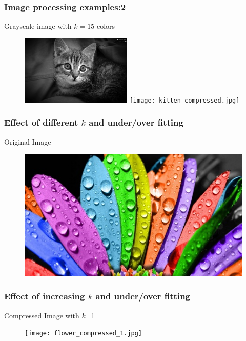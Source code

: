 \documentclass{beamer}
\begin{document}
\begin{frame}
\frametitle{Image processing examples:2}
Grayscale image with $k=15$ colors
\begin{figure}
\includegraphics[width=150pt]{kitten.jpg}
\quad 
\texttt{[image: kitten\_compressed.jpg]}
\end{figure}
\end{frame}

\begin{frame}
\frametitle{Effect of different $k$ and under/over fitting}
\begin{center}
Original Image
\end{center}
\begin{figure}
\includegraphics[scale=0.7]{flower.jpg}
\end{figure}
\end{frame}
 

\begin{frame}
\frametitle{Effect of increasing $k$ and under/over fitting}
\begin{center}
Compressed Image with $k$=1
\end{center}
\begin{figure}
\texttt{[image: flower\_compressed\_1.jpg]}
\end{figure}
\end{frame}
\end{document}
